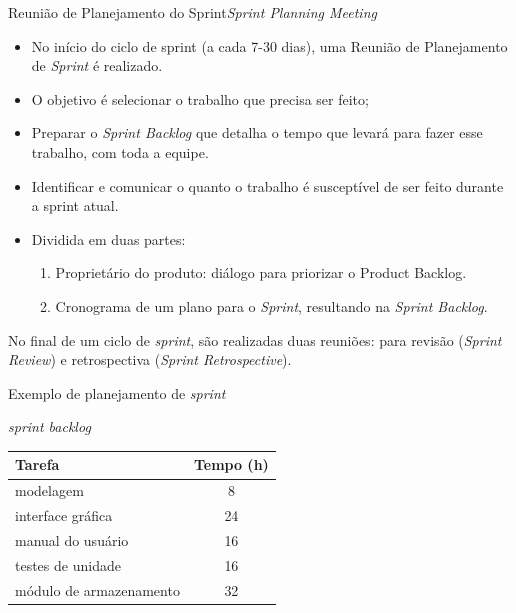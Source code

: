 \begin{frame}{Reunião de Planejamento do Sprint}{\em Sprint Planning Meeting}
\small
\begin{itemize}[<+-| alert@+>]
\item No início do ciclo de sprint (a cada 7-30 dias), uma Reunião de
  Planejamento de {\em Sprint} é realizado.  
\item O objetivo é selecionar o trabalho que precisa ser feito;
\item Preparar o {\em Sprint Backlog} que detalha o tempo que
  levará para fazer esse trabalho, com toda a equipe.  
\item   Identificar e comunicar o quanto o trabalho é susceptível de ser feito durante a
  sprint atual.  
\item Dividida em duas partes: 
  \begin{enumerate}
    \item  Proprietário do produto: diálogo para priorizar o Product
  Backlog.  
\item Cronograma de um  plano para o {\em Sprint}, resultando na {\em Sprint Backlog}.  
\end{enumerate}
\end{itemize}

\pause\bigskip No final de um ciclo de {\em sprint}, são realizadas duas
reuniões: para \alert{revisão} ({\em Sprint Review}) e
\alert{retrospectiva} ({\em Sprint Retrospective}).
\end{frame}

\begin{frame}{Exemplo de planejamento de {\em sprint}}
  \begin{block}{{\em sprint backlog}}
  \begin{center}
    \begin{tabular}[ht]{|l|c|}\hline
      \bf\hfil Tarefa & \bf Tempo (h) \\\hline
      modelagem & 8 \\\hline
      interface gráfica & 24 \\\hline
      manual do usuário & 16 \\\hline
      testes de unidade & 16 \\\hline
      módulo de armazenamento & 32 \\\hline
    \end{tabular}
  \end{center}
\end{block}
\end{frame}

